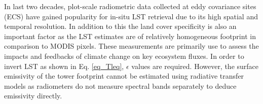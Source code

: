\documentclass[fleqn,10pt]{wlscirep}
\begin{document}
In last two decades, plot-scale radiometric data collected at eddy covariance sites (ECS) have gained popularity for in-situ LST retrieval due to its high spatial and temporal resolution. In addition to this the land cover specificity is also an important factor as the LST estimates are of relatively homogeneous footprint in comparison to MODIS pixels. These measurements are primarily use to assess the impacts and feedbacks of climate change on key ecosystem fluxes\cite{baldocchi2001fluxnet}. In order to invert LST as shown in Eq. \eqref{eq_Tleq}, $\epsilon$ values are required. However, the surface emissivity of the tower footprint cannot be estimated using radiative transfer models as radiometers do not measure spectral bands separately to deduce emissivity directly. 
\end{document}
